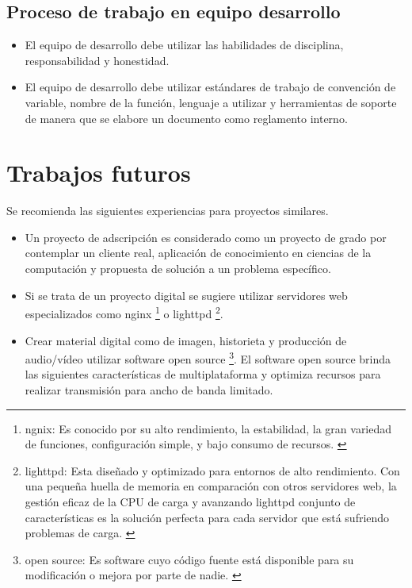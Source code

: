 \subsection{Proceso de trabajo en equipo desarrollo}

\begin{itemize}

\item El equipo de desarrollo debe utilizar las habilidades de disciplina,
responsabilidad y honestidad.

\item El equipo de desarrollo debe utilizar estándares de trabajo de convención
de variable, nombre de la función, lenguaje a utilizar y herramientas de
soporte de manera que se elabore un documento como reglamento interno.

\end{itemize}

\section{Trabajos futuros}

Se recomienda las siguientes experiencias para proyectos similares.

\begin{itemize}

\item Un proyecto de adscripción es considerado como un proyecto de grado
por contemplar un cliente real, aplicación de conocimiento en ciencias de
la computación y propuesta de solución a un problema específico.

\item Si se trata de un proyecto digital se sugiere utilizar servidores web 
especializados como nginx \footnote{ngnix: Es conocido por su alto 
rendimiento, la estabilidad, la gran variedad de funciones, configuración
simple, y bajo consumo de recursos. \cite{nginx}}  o lighttpd \footnote{lighttpd: 
Esta diseñado y optimizado para entornos de alto rendimiento. Con una 
pequeña huella de memoria en comparación con otros servidores web, la
gestión eficaz de la CPU de carga y avanzando lighttpd conjunto de 
características es la solución perfecta para cada servidor que está
sufriendo problemas de carga. \cite{lighttps}}.
 
\item Crear material digital como de imagen, historieta y producción de
audio/vídeo utilizar software open source \footnote{open source: Es software
cuyo código fuente está disponible para su modificación o mejora por parte
de nadie. \cite{openSource}}. El software open source brinda las siguientes
características de multiplataforma y optimiza recursos para realizar
transmisión para ancho de banda limitado.

\end{itemize}